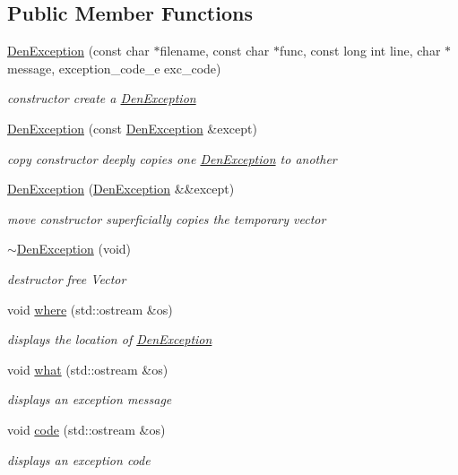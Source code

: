 \subsection*{Public Member Functions}
\begin{DoxyCompactItemize}
\item 
\hyperlink{classDenException_a8ae37243a8123f2b42fecc82b0953e6c}{Den\+Exception} (const char $\ast$filename, const char $\ast$func, const long int line, char $\ast$message, exception\+\_\+code\+\_\+e exc\+\_\+code)
\begin{DoxyCompactList}\small\item\em constructor  create a \hyperlink{classDenException}{Den\+Exception} \end{DoxyCompactList}\item 
\hyperlink{classDenException_a515eeb5f86c2ed600a484b2653b10e48}{Den\+Exception} (const \hyperlink{classDenException}{Den\+Exception} \&except)
\begin{DoxyCompactList}\small\item\em copy constructor  deeply copies one \hyperlink{classDenException}{Den\+Exception} to another \end{DoxyCompactList}\item 
\hyperlink{classDenException_a6e21462a638a18d3af11e183bbb2e441}{Den\+Exception} (\hyperlink{classDenException}{Den\+Exception} \&\&except)
\begin{DoxyCompactList}\small\item\em move constructor  superficially copies the temporary vector \end{DoxyCompactList}\item 
\mbox{\label{classDenException_a90812cb3af8ed4794c411b575c30c5c0}} 
\hyperlink{classDenException_a90812cb3af8ed4794c411b575c30c5c0}{$\sim$\+Den\+Exception} (void)
\begin{DoxyCompactList}\small\item\em destructor  free Vector \end{DoxyCompactList}\item 
void \hyperlink{classDenException_a9ea40d7917b2148f9183ce63bde612a8}{where} (std\+::ostream \&os)
\begin{DoxyCompactList}\small\item\em displays the location of \hyperlink{classDenException}{Den\+Exception} \end{DoxyCompactList}\item 
void \hyperlink{classDenException_a52785aeb451bf203cda123c8dcc9d64e}{what} (std\+::ostream \&os)
\begin{DoxyCompactList}\small\item\em displays an exception message \end{DoxyCompactList}\item 
void \hyperlink{classDenException_a81eaeb9c2f6845516f25ead861040a93}{code} (std\+::ostream \&os)
\begin{DoxyCompactList}\small\item\em displays an exception code \end{DoxyCompactList}\end{DoxyCompactItemize}
